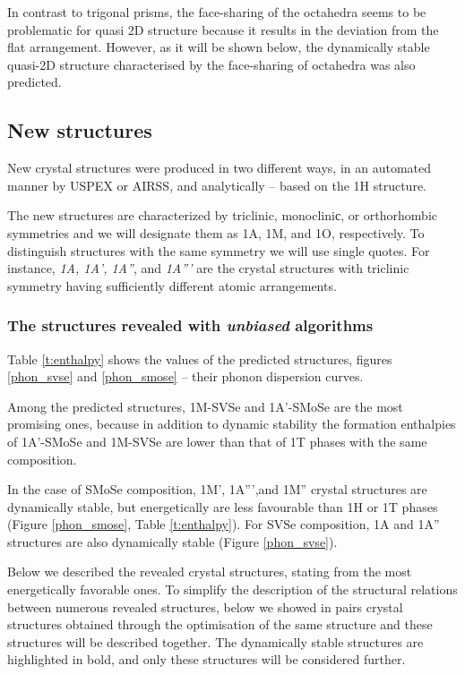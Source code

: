 \documentclass[a4paperm]{article}
\begin{document}
In contrast to trigonal prisms, the face-sharing of the octahedra seems to be problematic for quasi 2D structure because it results in the deviation from the flat arrangement.
However, as it will be shown below, the dynamically stable quasi-2D structure characterised by the face-sharing of octahedra was also predicted.



		\subsection{New structures}

New crystal structures were produced in two different ways, in an automated manner by USPEX or AIRSS, and analytically -- based on the 1H structure.

The new structures are characterized by triclinic, monocliniс, or orthorhombic symmetries and we will designate them as 1A, 1M, and 1O, respectively.
To distinguish structures with the same symmetry we will use single quotes.
For instance, {\it 1A, 1A', 1A''}, and {\it 1A'''} are the crystal structures with triclinic symmetry having sufficiently different atomic arrangements.


\subsubsection{The structures revealed with {\it unbiased} algorithms}
Table \ref{t:enthalpy} shows the values of the predicted structures, figures \ref{phon_svse} and  \ref{phon_smose} -- their phonon dispersion curves. 

Among the predicted structures, 1M-SVSe and 1A'-SMoSe are the most promising ones, because in addition to dynamic stability the formation enthalpies of 1A'-SMoSe and 1M-SVSe are lower than that of 1T phases with the same composition. 

In the case of SMoSe composition, 1M', 1A''',and 1M'' crystal structures are dynamically stable, but energetically are less favourable than 1H or 1T phases (Figure \ref{phon_smose}, Table \ref{t:enthalpy}).
For SVSe composition, 1A and 1A'' structures are also dynamically stable (Figure \ref{phon_svse}). 

Below we described the revealed crystal structures, stating from the most energetically favorable ones.
To simplify the description of the structural relations between numerous revealed structures, below we showed in pairs crystal structures obtained through the optimisation of the same structure and these structures will be described together.
The dynamically stable structures are highlighted in bold, and only these structures will be considered further.
\end{document}
